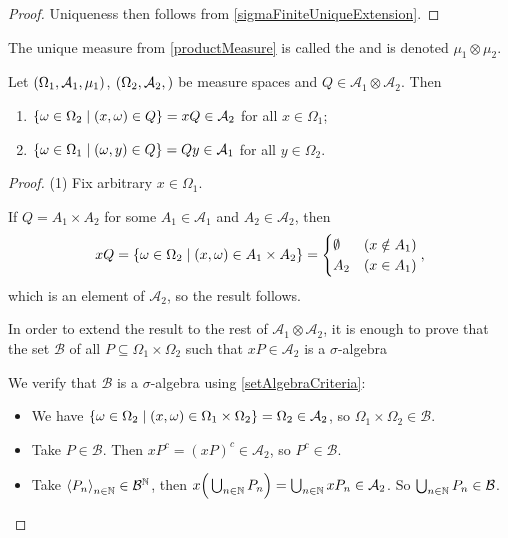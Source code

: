 \begin{proof}
Uniqueness then follows from \ref{sigmaFiniteUniqueExtension}.
\end{proof}

\begin{definition}
The unique measure from \ref{productMeasure} is called the  and is denoted $\mu_1\otimes \mu_2$.
\end{definition}

\begin{proposition} \label{setSectionMeasurable}
Let $\sSet{\Omega_1, \mathcal{A}_1,\mu_1}$, $\sSet{\Omega_2, \mathcal{A}_2, }$ be measure spaces and $Q\in \mathcal{A}_1\otimes\mathcal{A}_2$. Then
\begin{enumerate}
\item $\setbuilder{\omega\in\Omega_2}{(x,\omega)\in Q} = xQ \in\mathcal{A}_2$ for all $x\in\Omega_1$;
\item $\setbuilder{\omega\in\Omega_1}{(\omega, y)\in Q} = Qy \in\mathcal{A}_1$ for all $y\in\Omega_2$.
\end{enumerate}
\end{proposition}
\begin{proof}
(1) Fix arbitrary $x\in\Omega_1$.

If $Q = A_1\times A_2$ for some $A_1\in\mathcal{A}_1$ and $A_2\in\mathcal{A}_2$, then
\[ xQ = \setbuilder{\omega\in\Omega_2}{(x,\omega) \in A_1\times A_2} = \begin{cases}
\emptyset & (x\notin A_1) \\
A_2 & (x\in A_1)
\end{cases}, \]
which is an element of $\mathcal{A}_2$, so the result follows.

In order to extend the result to the rest of $\mathcal{A}_1\otimes \mathcal{A}_2$, it is enough to prove that the set $\mathcal{B}$ of all $P\subseteq \Omega_1\times \Omega_2$ such that $xP\in\mathcal{A}_2$ is a $\sigma$-algebra

We verify that $\mathcal{B}$ is a $\sigma$-algebra using \ref{setAlgebraCriteria}:
\begin{itemize}
\item We have $\setbuilder{\omega\in\Omega_2}{(x,\omega)\in \Omega_1\times \Omega_2} = \Omega_2 \in\mathcal{A}_2$, so $\Omega_1\times\Omega_2\in\mathcal{B}$.
\item Take $P\in\mathcal{B}$. Then $xP^c = (xP)^c \in \mathcal{A}_2$, so $P^c\in \mathcal{B}$.
\item Take $\left\langle P_n \right\rangle_{n\in\mathbb{N}}\in \mathcal{B}^{\mathbb{N}}$, then $x\Big(\bigcup_{n\in\mathbb{N}}P_n\Big) = \bigcup_{n\in\mathbb{N}}xP_n \in \mathcal{A}_2$. So $\bigcup_{n\in\mathbb{N}}P_n\in \mathcal{B}$.
\end{itemize}
\end{proof}
